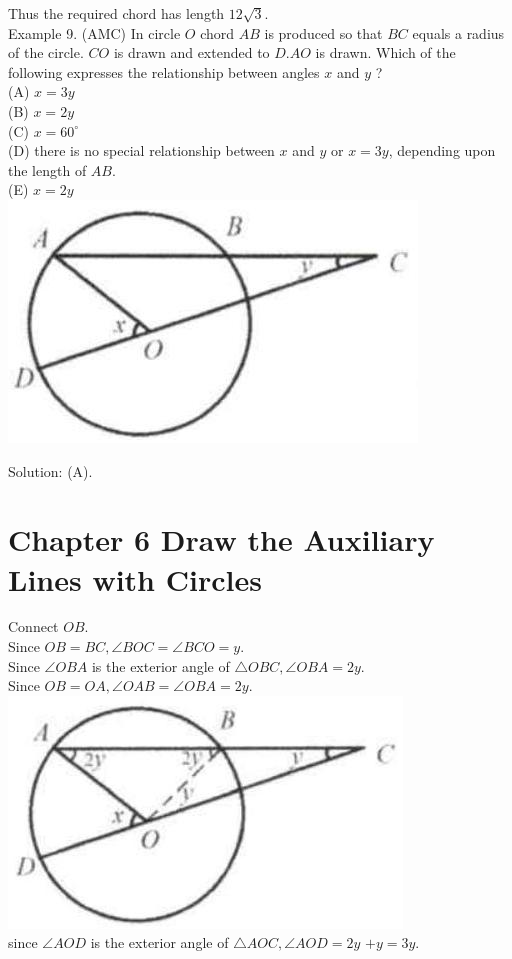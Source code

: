\documentclass[10pt]{article}
\begin{document}
Thus the required chord has length \(12 \sqrt{3}\).\\
Example 9. (AMC) In circle \(O\) chord \(A B\) is produced so that \(B C\) equals a radius of the circle. \(C O\) is drawn and extended to \(D . A O\) is drawn. Which of the following expresses the relationship between angles \(x\) and \(y\) ?\\
(A) \(x=3 y\)\\
(B) \(x=2 y\)\\
(C) \(x=60^{\circ}\)\\
(D) there is no special relationship between \(x\) and \(y\) or \(x=3 y\), depending upon the length of \(A B\).\\
(E) \(x=2 y\)\\
\includegraphics[max width=\textwidth, center]{2025_04_17_97bc1f7e44d93c271a88g-150(2)}

Solution: (A).

\section*{Chapter 6 Draw the Auxiliary Lines with Circles}
Connect \(O B\).\\
Since \(O B=B C, \angle B O C=\angle B C O=y\).\\
Since \(\angle O B A\) is the exterior angle of \(\triangle O B C, \angle O B A=2 y\).\\
Since \(O B=O A, \angle O A B=\angle O B A=2 y\).\\
\includegraphics[max width=\textwidth, center]{2025_04_17_97bc1f7e44d93c271a88g-151(2)}\\
since \(\angle A O D\) is the exterior angle of \(\triangle A O C, \angle A O D=2 y\) \(+y=3 y\).
\end{document}
